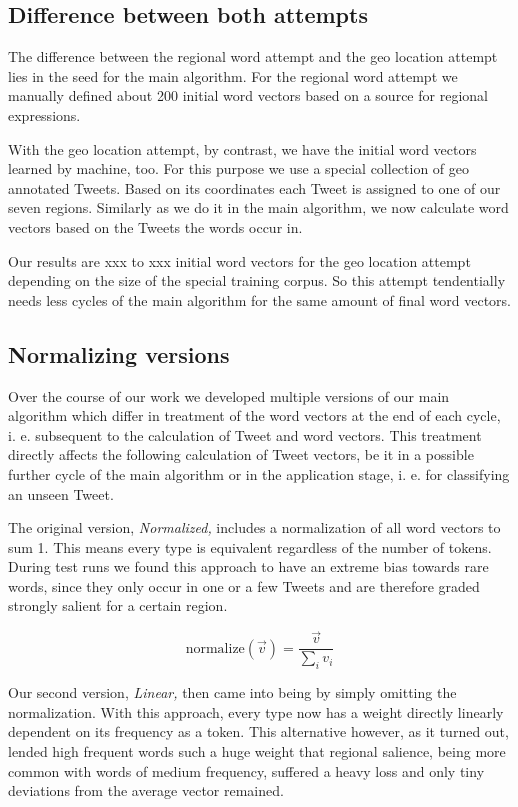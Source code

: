\documentclass[../Main.tex]{subfiles}
\begin{document}
\subsection{Difference between both attempts}
The difference between the regional word attempt and the geo location attempt lies in the seed for the main algorithm. For the regional word attempt we manually defined about 200 initial word vectors based on a source for regional expressions.

With the geo location attempt, by contrast, we have the initial word vectors learned by machine, too. For this purpose we use a special collection of geo annotated Tweets. Based on its coordinates each Tweet is assigned to one of our seven regions. Similarly as we do it in the main algorithm, we now calculate word vectors based on the Tweets the words occur in.

Our results are xxx to xxx initial word vectors for the geo location attempt depending on the size of the special training corpus. So this attempt tendentially needs less cycles of the main algorithm for the same amount of final word vectors.

\subsection{Normalizing versions}
Over the course of our work we developed multiple versions of our main algorithm which differ in treatment of the word vectors at the end of each cycle, i. e. subsequent to the calculation of Tweet and word vectors. This treatment directly affects the following calculation of Tweet vectors, be it in a possible further cycle of the main algorithm or in the application stage, i. e. for classifying an unseen Tweet.

The original version, \textit{Normalized,} includes a normalization of all word vectors to sum 1. This means every type is equivalent regardless of the number of tokens. During test runs we found this approach to have an extreme bias towards rare words, since they only occur in one or a few Tweets and are therefore graded strongly salient for a certain region.

$$\text{normalize}(\vec v) = \frac{\vec v}{\sum_i v_i}$$

Our second version, \textit{Linear,} then came into being by simply omitting the normalization. With this approach, every type now has a weight directly linearly dependent on its frequency as a token. This alternative however, as it turned out, lended high frequent words such a huge weight that regional salience, being more common with words of medium frequency, suffered a heavy loss and only tiny deviations from the average vector remained.
\end{document}
